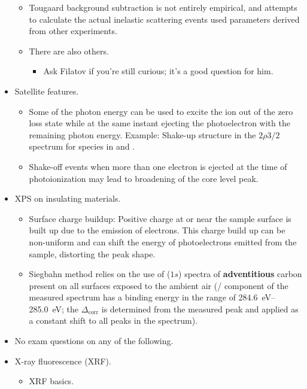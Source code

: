 \documentclass[../notes.tex]{subfiles}
\begin{document}
\begin{itemize}
\begin{itemize}
        \item Tougaard background subtraction is not entirely empirical, and attempts to calculate the actual inelastic scattering events used parameters derived from other experiments.
        \item There are also others.
        \begin{itemize}
            \item Ask Filatov if you're still curious; it's a good question for him.
        \end{itemize}
    \end{itemize}
    \item Satellite features.
    \begin{itemize}
        \item Some of the photon energy can be used to excite the ion out of the zero loss state while at the same instant ejecting the photoelectron with the remaining photon energy. Example: Shake-up structure in the $2\rho 3/2$ spectrum for  species in  and .
        \item Shake-off events when more than one electron is ejected at the time of photoionization may lead to broadening of the core level peak.
    \end{itemize}
    \item XPS on insulating materials.
    \begin{itemize}
        \item Surface charge buildup: Positive charge at or near the sample surface is built up due to the emission of electrons. This charge build up can be non-uniform and can shift the energy of photoelectrons emitted from the sample, distorting the peak shape.
        \item Siegbahn method relies on the use of ($1s$) spectra of \textbf{adventitious} carbon present on all surfaces exposed to the ambient air (/ component of the measured  spectrum has a binding energy in the range of \SIrange{284.6}{285.0}{\electronvolt}; the $\Delta_\text{corr}$ is determined from the measured peak and applied as a constant shift to all peaks in the spectrum).
    \end{itemize}
    \item No exam questions on any of the following.
    \item X-ray fluorescence (XRF).
    \begin{itemize}
        \item XRF basics.
        \begin{itemize}

\end{itemize}
\end{itemize}
\end{itemize}
\end{document}
